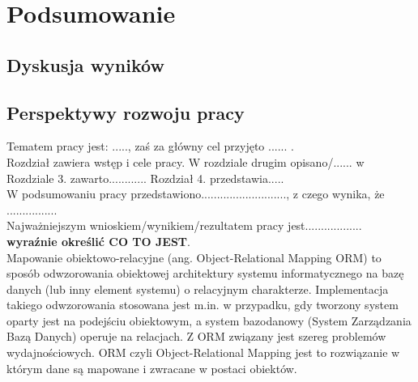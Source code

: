 \documentclass[12pt]{report}
\begin{document}
\chapter{Podsumowanie} \label{podsumowanie}

\section{Dyskusja wyników}

\section{Perspektywy rozwoju pracy} %


\newpage

Tematem pracy jest: ....., zaś za główny cel przyjęto ...... . \\
Rozdział \label{rozdz.wstep} zawiera wstęp i cele pracy. W rozdziale drugim
opisano/...... w Rozdziale 3. zawarto............ Rozdział 4. przedstawia..... \\
W podsumowaniu pracy przedstawiono..........................., z czego wynika,
że ................  \\
Najważniejszym wnioskiem/wynikiem/rezultatem pracy jest..................\\ {\bf wyraźnie określić
CO TO JEST}. \\


Mapowanie obiektowo-relacyjne (ang. Object-Relational Mapping ORM) to sposób odwzorowania obiektowej architektury systemu informatycznego na bazę danych (lub inny element systemu) o relacyjnym charakterze. Implementacja takiego odwzorowania stosowana jest m.in. w przypadku, gdy tworzony system oparty jest na podejściu obiektowym, a system bazodanowy (System Zarządzania Bazą Danych) operuje na relacjach. Z ORM związany jest szereg problemów wydajnościowych.
ORM czyli Object-Relational Mapping jest to rozwiązanie w którym dane są mapowane i zwracane w postaci obiektów.
\end{document}
